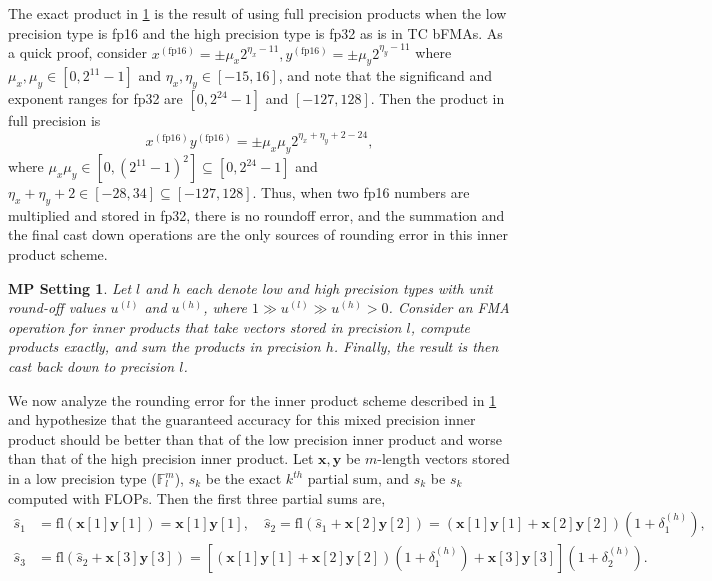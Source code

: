 \documentclass[review,onefignum,onetabnum]{siamart190516}
\newtheorem{assump}[theorem]{MP Setting}
\newcommand{\F}{\mathbb{F}}
\newcommand{\dd}{\delta}
\newcommand{\bb}[1]{\mathbf{#1}}
\newcommand{\fl}{\mathrm{fl}}
\begin{document}
The exact product in \cref{assump:mp} is the result of using full precision products when the low precision type is fp16 and the high precision type is fp32 as is in TC bFMAs.
As a quick proof, consider $x^{(\text{fp16})} = \pm\mu_x2^{\eta_x -11},y^{(\text{fp16})} = \pm\mu_y2^{\eta_y -11}$ where $\mu_x,\mu_y\in[0,2^{11}-1]$ and $\eta_x,\eta_y\in[-15,16]$, and note that the significand and exponent ranges for fp32 are $[0, 2^{24}-1]$ and $[-127,128]$.
Then the product in full precision is
\[x^{(\text{fp16})}y^{(\text{fp16})} = \pm\mu_x\mu_y 2^{\eta_x+\eta_y+2-24},\]
where  $\mu_x\mu_y \in[0,(2^{11}-1)^2] \subseteq [0,2^{24}-1]$ and $\eta_x+\eta_y +2\in[-28,34]\subseteq[-127,128]$.
Thus, when two fp16 numbers are multiplied and stored in fp32, there is no roundoff error, and the summation and the final cast down operations are the only sources of rounding error in this inner product scheme.
\begin{assump}
	\label{assump:mp}
	Let $l$ and $h$ each denote low and high precision types with unit round-off values $u^{(l)}$ and $u^{(h)}$, where $1 \gg u^{(l)} \gg u^{(h)} >0$.
	Consider an FMA operation for inner products that take vectors stored in precision $l$, compute products exactly, and sum the products in precision $h$. 
	Finally, the result is then cast back down to precision $l$.
\end{assump}
We now analyze the rounding error for the inner product scheme described in \cref{assump:mp} and hypothesize that the guaranteed accuracy for this mixed precision inner product should be better than that of the low precision inner product and worse than that of the high precision inner product.
Let $\bb{x},\bb{y}$ be $m$-length vectors stored in a low precision type ($\F_l^m$), $s_k$ be the exact $k^{th}$ partial sum, and $\hat{s}_k$ be $s_k$ computed with FLOPs.
Then the first three partial sums are,
\begin{align*}
\hat{s}_1 &= \fl (\bb{x}[1]\bb{y}[1]) = \bb{x}[1]\bb{y}[1],\quad \hat{s}_2 = \fl(\hat{s}_1 + \bb{x}[2]\bb{y}[2]) = \left(\bb{x}[1]\bb{y}[1]+ \bb{x}[2]\bb{y}[2]\right)(1+\dd_{1}^{(h)}),\\
\hat{s}_3 &= \fl(\hat{s}_2+\bb{x}[3]\bb{y}[3]) = \left[\left(\bb{x}[1]\bb{y}[1] + \bb{x}[2]\bb{y}[2]\right)(1+\dd_{1}^{(h)})  + \bb{x}[3]\bb{y}[3]\right](1+\dd_{2}^{(h)}).
\end{align*}
\end{document}
